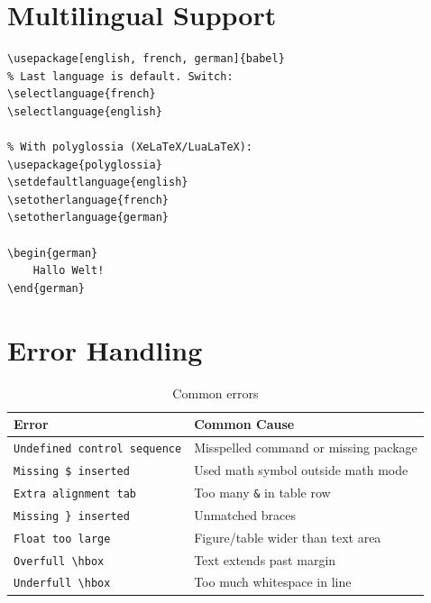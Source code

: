 \section{Multilingual Support}

\begin{lstlisting}[language={[LaTeX]TeX}, caption=Multilingual documents]
% With babel:
\usepackage[english, french, german]{babel}
% Last language is default. Switch:
\selectlanguage{french}
\selectlanguage{english}

% With polyglossia (XeLaTeX/LuaLaTeX):
\usepackage{polyglossia}
\setdefaultlanguage{english}
\setotherlanguage{french}
\setotherlanguage{german}

\begin{german}
    Hallo Welt!
\end{german}
\end{lstlisting}

\section{Error Handling}

\begin{table}[H]
\centering
\begin{tabular}{lp{8cm}}
\toprule
\textbf{Error} & \textbf{Common Cause} \\
\midrule
\texttt{Undefined control sequence} & Misspelled command or missing package \\
\texttt{Missing \$ inserted}       & Used math symbol outside math mode \\
\texttt{Extra alignment tab}       & Too many \texttt{\&} in table row \\
\texttt{Missing \} inserted}       & Unmatched braces \\
\texttt{Float too large}           & Figure/table wider than text area \\
\texttt{Overfull \textbackslash hbox} & Text extends past margin \\
\texttt{Underfull \textbackslash hbox} & Too much whitespace in line \\
\bottomrule
\end{tabular}
\caption{Common \latex{} errors}
\end{table}

